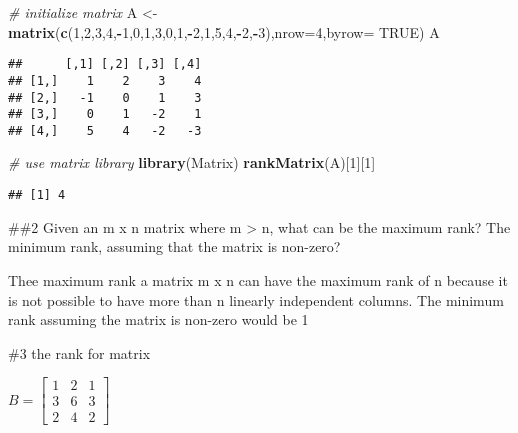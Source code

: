 \documentclass[
]{article}
\newenvironment{Shaded}{\begin{snugshade}}{\end{snugshade}}
\newcommand{\AttributeTok}[1]{\textcolor[rgb]{0.13,0.29,0.53}{#1}}
\newcommand{\CommentTok}[1]{\textcolor[rgb]{0.56,0.35,0.01}{\textit{#1}}}
\newcommand{\ConstantTok}[1]{\textcolor[rgb]{0.56,0.35,0.01}{#1}}
\newcommand{\DecValTok}[1]{\textcolor[rgb]{0.00,0.00,0.81}{#1}}
\newcommand{\FunctionTok}[1]{\textcolor[rgb]{0.13,0.29,0.53}{\textbf{#1}}}
\newcommand{\NormalTok}[1]{#1}
\newcommand{\OtherTok}[1]{\textcolor[rgb]{0.56,0.35,0.01}{#1}}
\newcommand{\SpecialCharTok}[1]{\textcolor[rgb]{0.81,0.36,0.00}{\textbf{#1}}}
\begin{document}
\begin{Shaded}
\begin{Highlighting}[]
\CommentTok{\# initialize matrix}
\NormalTok{A }\OtherTok{\textless{}{-}} \FunctionTok{matrix}\NormalTok{(}\FunctionTok{c}\NormalTok{(}\DecValTok{1}\NormalTok{,}\DecValTok{2}\NormalTok{,}\DecValTok{3}\NormalTok{,}\DecValTok{4}\NormalTok{,}\SpecialCharTok{{-}}\DecValTok{1}\NormalTok{,}\DecValTok{0}\NormalTok{,}\DecValTok{1}\NormalTok{,}\DecValTok{3}\NormalTok{,}\DecValTok{0}\NormalTok{,}\DecValTok{1}\NormalTok{,}\SpecialCharTok{{-}}\DecValTok{2}\NormalTok{,}\DecValTok{1}\NormalTok{,}\DecValTok{5}\NormalTok{,}\DecValTok{4}\NormalTok{,}\SpecialCharTok{{-}}\DecValTok{2}\NormalTok{,}\SpecialCharTok{{-}}\DecValTok{3}\NormalTok{),}\AttributeTok{nrow=}\DecValTok{4}\NormalTok{,}\AttributeTok{byrow=} \ConstantTok{TRUE}\NormalTok{)}
\NormalTok{A}
\end{Highlighting}
\end{Shaded}

\begin{verbatim}
##      [,1] [,2] [,3] [,4]
## [1,]    1    2    3    4
## [2,]   -1    0    1    3
## [3,]    0    1   -2    1
## [4,]    5    4   -2   -3
\end{verbatim}

\begin{Shaded}
\begin{Highlighting}[]
\CommentTok{\# use matrix library }
\FunctionTok{library}\NormalTok{(Matrix)}
\FunctionTok{rankMatrix}\NormalTok{(A)[}\DecValTok{1}\NormalTok{][}\DecValTok{1}\NormalTok{]}
\end{Highlighting}
\end{Shaded}

\begin{verbatim}
## [1] 4
\end{verbatim}

\#\#2 Given an m x n matrix where m \textgreater{} n, what can be the
maximum rank? The minimum rank, assuming that the matrix is non-zero?

Thee maximum rank a matrix m x n can have the maximum rank of n because
it is not possible to have more than n linearly independent columns. The
minimum rank assuming the matrix is non-zero would be 1

\#3 the rank for matrix

\(B = \begin{bmatrix}1 & 2 & 1\\ 3 &6 & 3 \\ 2 & 4 & 2 \end{bmatrix}\)
\end{document}
